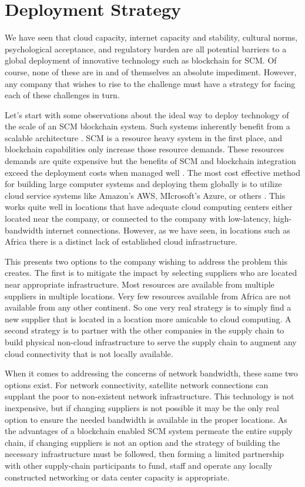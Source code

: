 \section{Deployment Strategy}

We have seen that cloud capacity, internet capacity and stability, cultural norms, psychological acceptance, and regulatory burden are all potential barriers to a global deployment of innovative technology such as blockchain for SCM. Of course, none of these are in and of themselves an absolute impediment. However, any company that wishes to rise to the challenge must have a strategy for facing each of these challenges in turn.

Let's start with some observations about the ideal way to deploy technology of the scale of an SCM blockchain system. Such systems inherently benefit from a scalable architecture \parencite{gokalpAcceptanceBlockchainBased2019}. SCM is a resource heavy system in the first place, and blockchain capabilities only increase those resource demands. These resources demands are quite expensive but the benefits of SCM and blockchain integration exceed the deployment costs when managed well \parencite{balSupplyChainFinance2021}. The most cost effective method for building large computer systems and deploying them globally is to utilize cloud service systems like Amazon's AWS, MIcrosoft's Azure, or others \parencite{carcaryAdoptionCloudComputing2014}. This works quite well in locations that have adequate cloud computing centers either located near the company, or connected to the company with low-latency, high-bandwidth internet connections. However, as we have seen, in locations such as Africa there is a distinct lack of established cloud infrastructure.

This presents two options to the company wishing to address the problem this creates. The first is to mitigate the impact by selecting suppliers who are located near appropriate infrastructure. Most resources are available from multiple suppliers in multiple locations. Very few resources available from Africa are not available from any other continent. So one very real strategy is to simply find a new supplier that is located in a location more amicable to cloud computing. A second strategy is to partner with the other companies in the supply chain to build physical non-cloud infrastructure to serve the supply chain to augment any cloud connectivity that is not locally available.

When it comes to addressing the concerns of network bandwidth, these same two options exist. For network connectivity, satellite network connections can supplant the poor to non-existent network infrastructure. This technology is not inexpensive, but if changing suppliers is not possible it may be the only real option to ensure the needed bandwidth is available in the proper locations. As the advantages of a blockchain enabled SCM system permeate the entire supply chain, if changing suppliers is not an option and the strategy of building the necessary infrastructure must be followed, then forming a limited partnership with other supply-chain participants to fund, staff and operate any locally constructed networking or data center capacity is appropriate.

